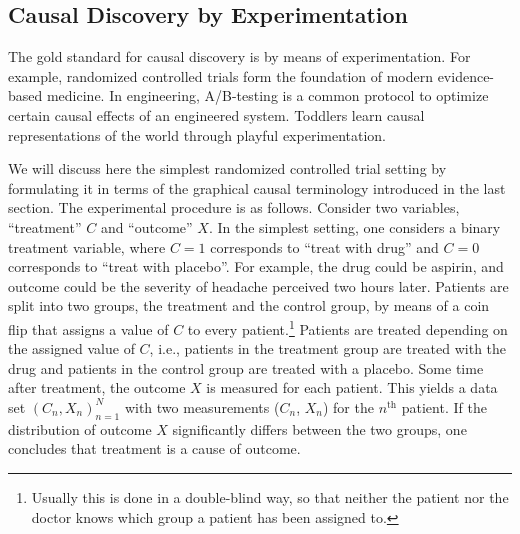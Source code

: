 \documentclass[twoside,11pt]{article}
\begin{document}
\subsection{Causal Discovery by Experimentation}\label{sec:CDexp}

The gold standard for causal discovery is by means of experimentation. For example, 
randomized controlled trials \citep{Fisher1935} form the foundation 
of modern evidence-based medicine. In engineering, A/B-testing is a
common protocol to optimize certain causal effects of an engineered
system. Toddlers learn causal representations of the world through playful
experimentation. 

We will discuss here the simplest randomized controlled trial setting by formulating
it in terms of the graphical causal terminology introduced in the last section. 
The experimental procedure is as follows.
Consider two variables, ``treatment'' $C$ and ``outcome'' $X$. In the simplest setting, one considers a 
binary treatment variable, where $C=1$ corresponds to ``treat with drug'' and
$C=0$ corresponds to ``treat with placebo''. For example, the drug could be aspirin,
and outcome could be the severity of headache perceived two
hours later. Patients are split into two groups,
the treatment and the control group, by means of a coin flip that assigns a value
of $C$ to every patient.\footnote{Usually this is done in a double-blind way, so
that neither the patient nor the doctor knows which group a patient has been assigned
to.} Patients are treated depending on the assigned value of $C$, i.e., patients in the
treatment group are treated with the drug and patients in the control group are treated
with a placebo. Some time after treatment, the outcome $X$ is measured for each patient. 
This yields a data set $(C_n,X_n)_{n=1}^N$
with two measurements ($C_n$, $X_n$) for the $n^{\mathrm{th}}$ patient. 
If the distribution of outcome $X$ significantly differs between the two groups,
one concludes that treatment is a cause of outcome. 
\end{document}
